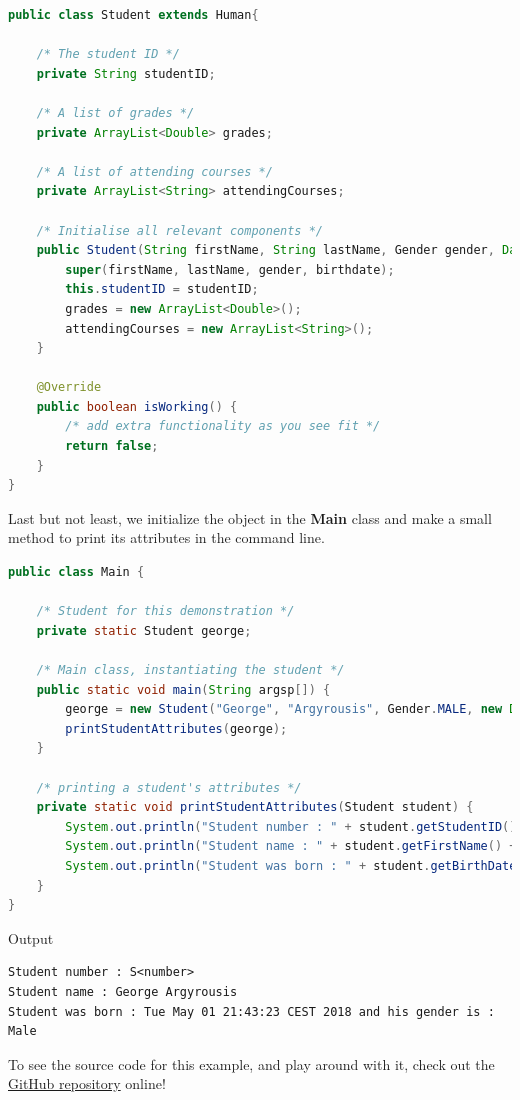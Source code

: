 \documentclass{article}
\begin{document}
\begin{lstlisting}[language=java]
public class Student extends Human{
	
	/* The student ID */
	private String studentID;
	
	/* A list of grades */
	private ArrayList<Double> grades;
	
	/* A list of attending courses */
	private ArrayList<String> attendingCourses;

	/* Initialise all relevant components */
	public Student(String firstName, String lastName, Gender gender, Date birthdate, String studentID) {
		super(firstName, lastName, gender, birthdate);
		this.studentID = studentID;
		grades = new ArrayList<Double>();
		attendingCourses = new ArrayList<String>();
	}

	@Override
	public boolean isWorking() {
		/* add extra functionality as you see fit */
		return false;
	}
}
\end{lstlisting}
Last but not least, we initialize the object in the \textbf{Main} class and make a small method to print its attributes in the command line. 
\begin{lstlisting}[language=Java]
public class Main {
	
	/* Student for this demonstration */
	private static Student george;
	
	/* Main class, instantiating the student */
	public static void main(String argsp[]) {
		george = new Student("George", "Argyrousis", Gender.MALE, new Date(), "S<number>");
		printStudentAttributes(george);
	}
	
	/* printing a student's attributes */
	private static void printStudentAttributes(Student student) {
		System.out.println("Student number : " + student.getStudentID());
		System.out.println("Student name : " + student.getFirstName() + " " + student.getLastName());
		System.out.println("Student was born : " + student.getBirthDate() + " and his gender is : " + student.getGender());
	}
}
\end{lstlisting}
Output\\

\begin{lstlisting}
Student number : S<number>
Student name : George Argyrousis
Student was born : Tue May 01 21:43:23 CEST 2018 and his gender is : Male
\end{lstlisting}
To see the source code for this example, and play around with it, check out the \href{https://github.com/andrewlalis/CommandPatternTutorial}{GitHub repository} online!
\end{document}
